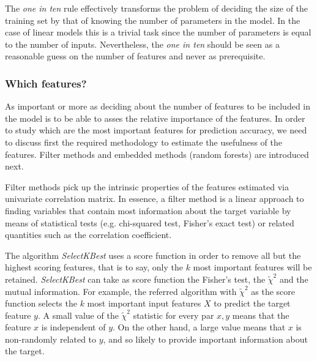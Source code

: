 \documentclass[preprint,12pt]{elsarticle}
\begin{document}
The \emph{one in ten} rule effectively transforms the problem of deciding the size of the training set by that of knowing the number of parameters in the model. In the case of linear models this is a trivial task since the number of parameters is equal to the number of inputs. 
Nevertheless, the \emph{one in ten} should be seen as a reasonable guess on the number of features and never as prerequisite.
\subsubsection{Which features?}
As important or more as deciding about the number of features to be included in the model is to be able to asses the relative importance of the features. In order to study which are the most important features for prediction accuracy, we need to discuss first the required methodology to estimate the usefulness of the features. Filter methods and embedded methods (random forests) are introduced next.



Filter methods pick up the intrinsic properties of the features estimated via univariate correlation matrix. In essence, a filter method is a linear approach to finding variables that contain most information about the target variable by means of statistical tests (e.g. chi-squared test, Fisher's exact test) or related quantities such as the correlation coefficient.

The algorithm \emph{SelectKBest} \cite{scikit-learn} uses a score function in order to remove all but the highest scoring features, that is to say, only the $k$ most important features will be retained. \emph{SelectKBest} can take as score function the Fisher's test, the $\tilde{\chi}^2$ and the mutual information. For example, the referred algorithm with $\tilde{\chi}^2$ as the score function selects the $k$ most important input features $X$ to predict the target feature $y$. A small value of the $\tilde{\chi}^2$ statistic for every par $x,y$ means that the feature $x$ is independent of $y$. On the other hand, a large value means that $x$ is non-randomly related to $y$, and so likely to provide important information about the target. 
\end{document}
